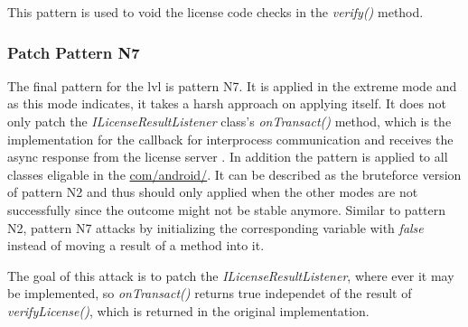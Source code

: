 This pattern is used to void the license code checks in the \textit{verify()} method.

\subsubsection{Patch Pattern N7}
The final pattern for the \gls{lvl} is pattern N7.
It is applied in the extreme mode and as this mode indicates, it takes a harsh approach on applying itself.
It does not only patch the \textit{ILicenseResultListener} class's \textit{onTransact()} method, which is the implementation for the callback for interprocess communication and receives the async response from the license server \cite{developersLicensingReference}.
In addition the pattern is applied to all classes eligable in the \url{com/android/}.
It can be described as the bruteforce version of pattern N2 and thus should only applied when the other modes are not successfully since the outcome might not be stable anymore.
\newline
Similar to pattern N2, pattern N7 attacks by initializing the corresponding variable with \textit{false} instead of moving a result of a method into it.
\newline

The goal of this attack is to patch the \textit{ILicenseResultListener}, where ever it may be implemented, so \textit{onTransact()} returns true independet of the result of \textit{verifyLicense()}, which is returned in the original implementation.

